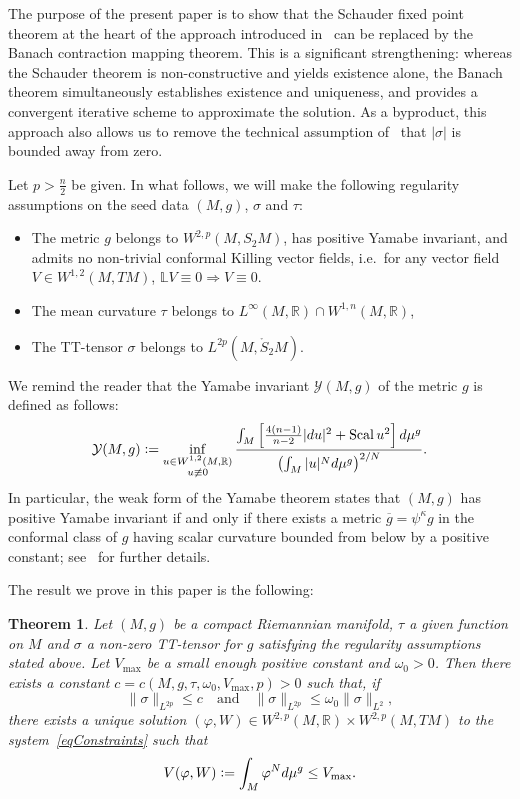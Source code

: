 \documentclass[a4paper, 10pt, reqno]{amsart}
\theoremstyle{plain}
\newtheorem{theorem}[thm]{Theorem}
\theoremstyle{remark}
\theoremstyle{definition}
\renewcommand{\phi}{\varphi}
\newcommand{\bR}{\mathbb{R}}
\newcommand{\bL}{\mathbb{L}}
\newcommand{\cY}{\mathcal{Y}}
\newcommand{\gbar}{\overline{g}}
\newcommand{\Sring}{\mathring{S}}
\newcommand{\definedas}{\mathrel{\raise.095ex\hbox{\rm :}\mkern-5.2mu=}}
\newcommand{\scal}{\mathrm{Scal}}
\begin{document}
The purpose of the present paper is to show that the Schauder fixed point
theorem at the heart of the approach introduced in~\cite{HNT1, HNT2,
    MaxwellNonCMC} can be replaced by the Banach contraction mapping theorem. This
is a significant strengthening: whereas the Schauder theorem is
non-constructive and yields existence alone, the Banach theorem simultaneously
establishes existence and uniqueness, and provides a convergent iterative
scheme to approximate the solution. As a byproduct, this approach also allows
us to remove the technical assumption of~\cite{GicquaudUniqueness} that
$|\sigma|$ is bounded away from zero.

Let $p > \frac{n}{2}$ be given. In what follows, we will make the following
regularity assumptions on the seed data $(M, g)$, $\sigma$ and $\tau$:
\begin{itemize}
    \item The metric $g$ belongs to $W^{2, p}(M, S_2M)$, has positive Yamabe invariant,
          and admits no non-trivial conformal Killing vector fields, i.e.\ for any vector
          field $V \in W^{1, 2}(M, TM)$, $\bL V \equiv 0 \Rightarrow V \equiv 0$.
    \item The mean curvature $\tau$ belongs to $L^\infty(M, \bR) \cap W^{1, n}(M, \bR)$,
    \item The TT-tensor $\sigma$ belongs to $L^{2p}(M, \Sring_2 M)$.
\end{itemize}

We remind the reader that the Yamabe invariant $\cY(M, g)$ of the metric $g$ is
defined as follows:
\[
    \cY(M, g) \definedas \inf_{\substack{u \in W^{1, 2}(M, \bR)\\ u \not\equiv 0}} \frac{\int_M \left[\frac{4(n-1)}{n-2} |du|^2 + \scal\, u^2\right] d\mu^g}{\left(\int_M |u|^N d\mu^g\right)^{2/N}}.
\]
In particular, the weak form of the Yamabe theorem states that $(M, g)$ has
positive Yamabe invariant if and only if there exists a metric $\gbar =
    \psi^\kappa g$ in the conformal class of $g$ having scalar curvature bounded
from below by a positive constant; see~\cite{LeeParker} for further details.

The result we prove in this paper is the following:
\begin{theorem}\label{thmMain}
    Let $(M, g)$ be a compact Riemannian manifold, $\tau$ a given function on $M$
    and $\sigma$ a non-zero TT-tensor for $g$ satisfying the regularity assumptions
    stated above. Let $V_{\max}$ be a small enough positive constant and $\omega_0
        > 0$. Then there exists a constant $c = c(M, g, \tau, \omega_0, V_{\max}, p) >
        0$ such that, if
    \[
        \|\sigma\|_{L^{2p}} \leq c \quad\text{and}\quad \|\sigma\|_{L^{2p}} \leq \omega_0 \|\sigma\|_{L^2},
    \]
    there exists a unique solution $(\phi, W) \in W^{2, p}(M, \bR) \times W^{2,
                p}(M, TM)$ to the system~\eqref{eqConstraints} such that
    \[
        V(\phi, W) \definedas \int_M \phi^N d\mu^g \leq V_{\max}.
    \]
\end{theorem}
\end{document}
